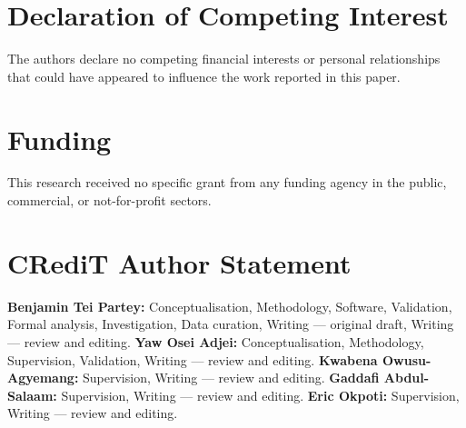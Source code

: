 \documentclass[final,3p]{elsarticle}
\newif\ifanonymous
\begin{document}
\section*{Declaration of Competing Interest}
The authors declare no competing financial interests or personal relationships that could have appeared to influence the work reported in this paper.

\section*{Funding}
This research received no specific grant from any funding agency in the public, commercial, or not-for-profit sectors.

\section*{CRediT Author Statement}
\ifanonymous
\textbf{Author 1:} Conceptualisation, Methodology, Software, Validation, Formal analysis, Investigation, Data curation, Writing --- original draft, Writing --- review and editing.
\textbf{Author 2:} Conceptualisation, Methodology, Supervision, Validation, Writing --- review and editing.
\textbf{Author 3:} Supervision, Writing --- review and editing.
\textbf{Author 4:} Supervision, Writing --- review and editing.
\textbf{Author 5:} Supervision, Writing --- review and editing.
\else
\textbf{Benjamin Tei Partey:} Conceptualisation, Methodology, Software, Validation, Formal analysis, Investigation, Data curation, Writing --- original draft, Writing --- review and editing.
\textbf{Yaw Osei Adjei:} Conceptualisation, Methodology, Supervision, Validation, Writing --- review and editing.
\textbf{Kwabena Owusu-Agyemang:} Supervision, Writing --- review and editing.
\textbf{Gaddafi Abdul-Salaam:} Supervision, Writing --- review and editing.
\textbf{Eric Okpoti:} Supervision, Writing --- review and editing.
\fi
\end{document}
